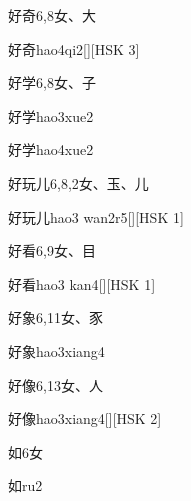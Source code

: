 \begin{entry}{好奇}{6,8}{⼥、⼤}
  \begin{phonetics}{好奇}{hao4qi2}[][HSK 3]
  \end{phonetics}
\end{entry}

\begin{entry}{好学}{6,8}{⼥、⼦}
  \begin{phonetics}{好学}{hao3xue2}
  \end{phonetics}
  \begin{phonetics}{好学}{hao4xue2}
  \end{phonetics}
\end{entry}

\begin{entry}{好玩儿}{6,8,2}{⼥、⽟、⼉}
  \begin{phonetics}{好玩儿}{hao3 wan2r5}[][HSK 1]
  \end{phonetics}
\end{entry}

\begin{entry}{好看}{6,9}{⼥、⽬}
  \begin{phonetics}{好看}{hao3 kan4}[][HSK 1]
  \end{phonetics}
\end{entry}

\begin{entry}{好象}{6,11}{⼥、⾗}
  \begin{phonetics}{好象}{hao3xiang4}
  \end{phonetics}
\end{entry}

\begin{entry}{好像}{6,13}{⼥、⼈}
  \begin{phonetics}{好像}{hao3xiang4}[][HSK 2]
  \end{phonetics}
\end{entry}

\begin{entry}{如}{6}{⼥}
  \begin{phonetics}{如}{ru2}
  \end{phonetics}
\end{entry}

